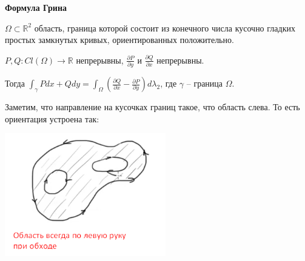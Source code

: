 \begin{theorem}\textbf{Формула Грина}

    $\Omega \subset \mathbb{R}^2$ область, граница которой состоит из конечного числа кусочно гладких простых замкнутых кривых, ориентированных положительно.

    $P, Q: Cl (\Omega) \to \mathbb{R}$ непрерывны, $\frac{\partial P}{\partial y}$ и $\frac{\partial Q}{\partial x}$ непрерывны.

    Тогда $\int_{\gamma}^{}Pdx + Qdy = \int_{\Omega}^{}(\frac{\partial Q}{\partial x} - \frac{\partial P}{\partial y}) d\lambda_2$, где $\gamma$ -- граница $\Omega$.

    Заметим, что направление на кусочках границ такое, что область слева. То есть ориентация устроена так:

    \begin{center}
        \includegraphics[width=7cm]{assets/03-intergrals-with-params/green-formula.png}
    \end{center}
\end{theorem}
